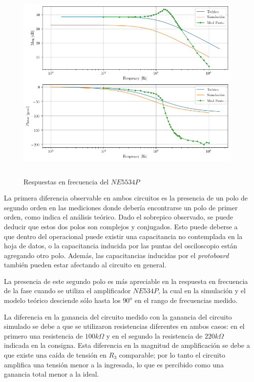 \begin{figure}
\begin{center}
\includegraphics[height=10cm]{./rsc/ne_bode_proto.png}
\caption{Respuestas en frecuencia del $NE5534P$}
\label{fig:e2_ne_bode}
\end{center}
\end{figure}

La primera diferencia observable en ambos circuitos es la presencia de un polo de segundo orden en las mediciones donde debería encontrarse un polo de primer orden, como indica el análisis teórico. Dado el sobrepico observado, se puede deducir que estos dos polos son complejos y conjugados.
Esto puede deberse a que dentro del operacional puede existir una capacitancia no contemplada en la hoja de datos, o la capacitancia inducida por las puntas del osciloscopio están agregando otro polo. Además, las capacitancias inducidas por el \textit{protoboard} también pueden estar afectando al circuito en general.

La presencia de este segundo polo es más apreciable en la respuesta en frecuencia de la fase cuando se utiliza el amplificador $NE534P$, la cual en la simulación y el modelo teórico desciende sólo hasta los $90^{\text{o}}$ en el rango de frecuencias medido.

La diferencia en la ganancia del circuito medido con la ganancia del circuito simulado se debe a que se utilizaron resistencias diferentes en ambos casos: en el primero una resistencia de $100k\Omega$ y en el segundo la resistencia de $220k\Omega$ indicada en la consigna. Esta diferencia en la magnitud de amplificación se debe a que existe una caída de tensión en $R_3$ comparable; por lo tanto el circuito amplifica una tensión menor a la ingresada, lo que es percibido como una ganancia total menor a la ideal.

